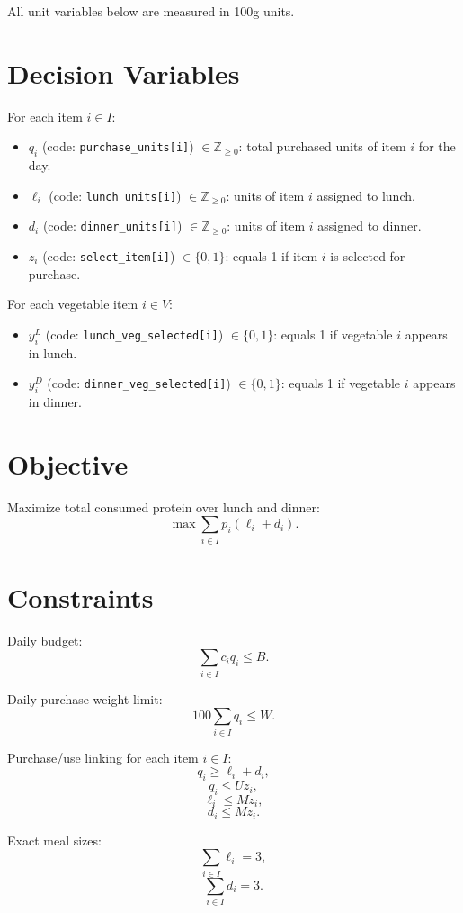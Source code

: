 All unit variables below are measured in 100g units.

\section*{Decision Variables}

For each item $i \in I$:
\begin{itemize}
    \item $q_i$ (code: \texttt{purchase\_units[i]}) $\in \mathbb{Z}_{\ge 0}$: total purchased units of item $i$ for the day.
    \item $\ell_i$ (code: \texttt{lunch\_units[i]}) $\in \mathbb{Z}_{\ge 0}$: units of item $i$ assigned to lunch.
    \item $d_i$ (code: \texttt{dinner\_units[i]}) $\in \mathbb{Z}_{\ge 0}$: units of item $i$ assigned to dinner.
    \item $z_i$ (code: \texttt{select\_item[i]}) $\in \{0,1\}$: equals 1 if item $i$ is selected for purchase.
\end{itemize}

For each vegetable item $i \in V$:
\begin{itemize}
    \item $y_i^L$ (code: \texttt{lunch\_veg\_selected[i]}) $\in \{0,1\}$: equals 1 if vegetable $i$ appears in lunch.
    \item $y_i^D$ (code: \texttt{dinner\_veg\_selected[i]}) $\in \{0,1\}$: equals 1 if vegetable $i$ appears in dinner.
\end{itemize}

\section*{Objective}

Maximize total consumed protein over lunch and dinner:
\[
\max \sum_{i \in I} p_i(\ell_i + d_i).
\]

\section*{Constraints}

Daily budget:
\[
\sum_{i \in I} c_i q_i \le B.
\]

Daily purchase weight limit:
\[
100 \sum_{i \in I} q_i \le W.
\]

Purchase/use linking for each item $i \in I$:
\[
q_i \ge \ell_i + d_i,
\]
\[
q_i \le U z_i,
\]
\[
\ell_i \le M z_i,
\]
\[
d_i \le M z_i.
\]

Exact meal sizes:
\[
\sum_{i \in I} \ell_i = 3,
\]
\[
\sum_{i \in I} d_i = 3.
\]

